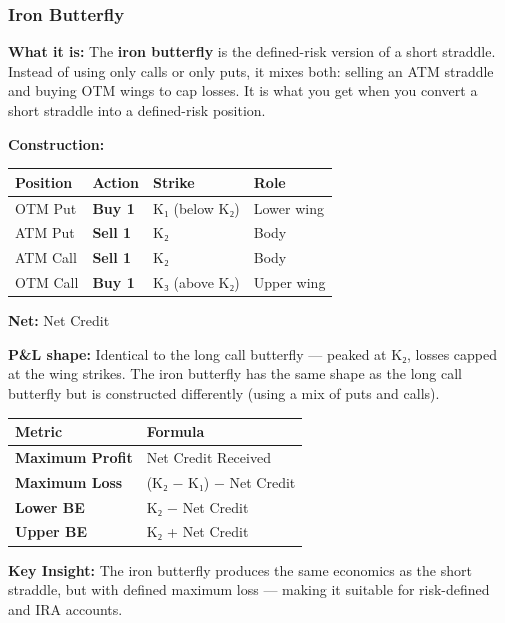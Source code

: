\documentclass[12pt,openany]{book}
\begin{document}
\subsubsection{Iron Butterfly}

\textbf{What it is:} The \textbf{iron butterfly} is the defined-risk version of a short straddle. Instead of using only calls or only puts, it mixes both: selling an ATM straddle and buying OTM wings to cap losses. It is what you get when you convert a short straddle into a defined-risk position.

\textbf{Construction:}

\begin{center}
\scriptsize
\setlength{\tabcolsep}{3pt}
\begin{tabular}{|L{3.31cm}|L{3.31cm}|L{3.31cm}|L{3.31cm}|}
\hline
Position & Action & Strike & Role \\
\hline
OTM Put & \textbf{Buy 1} & K₁ (below K₂) & Lower wing \\
\hline
ATM Put & \textbf{Sell 1} & K₂ & Body \\
\hline
ATM Call & \textbf{Sell 1} & K₂ & Body \\
\hline
OTM Call & \textbf{Buy 1} & K₃ (above K₂) & Upper wing \\
\hline
\end{tabular}
\end{center}

\textbf{Net:} Net Credit

\textbf{P\&L shape:} Identical to the long call butterfly — peaked at K₂, losses capped at the wing strikes. The iron butterfly has the same shape as the long call butterfly but is constructed differently (using a mix of puts and calls).

\begin{center}
\scriptsize
\setlength{\tabcolsep}{3pt}
\begin{tabular}{|L{6.00cm}|L{6.00cm}|}
\hline
Metric & Formula \\
\hline
\textbf{Maximum Profit} & Net Credit Received \\
\hline
\textbf{Maximum Loss} & (K₂ − K₁) − Net Credit \\
\hline
\textbf{Lower BE} & K₂ − Net Credit \\
\hline
\textbf{Upper BE} & K₂ + Net Credit \\
\hline
\end{tabular}
\end{center}

\textbf{Key Insight:} The iron butterfly produces the same economics as the short straddle, but with defined maximum loss — making it suitable for risk-defined and IRA accounts.
\end{document}
